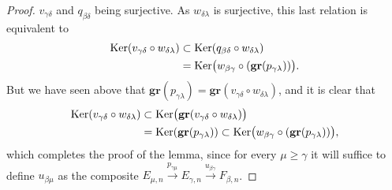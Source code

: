 \begin{proof}
$v_{\gamma\delta}$ and $q_{\beta\delta}$ being surjective.
As $w_{\delta\lambda}$ is surjective, this last relation is equivalent to
\[
\begin{split}
  \operatorname{Ker}(v_{\gamma\delta}\circ w_{\delta\lambda})
  &\subset\operatorname{Ker}(q_{\beta\delta}\circ w_{\delta\lambda})\\
  &=\operatorname{Ker}\bigl(w_{\beta\gamma}\circ(\mathbf{gr}(p_{\gamma\lambda}))\bigr).
\end{split}
\]
But we have seen above that
$\mathbf{gr}(p_{\gamma\lambda})=\mathbf{gr}(v_{\gamma\delta}\circ w_{\delta\lambda})$, and it is clear that
\[
\begin{split}
  \operatorname{Ker}(v_{\gamma\delta}\circ w_{\delta\lambda})
  &\subset\operatorname{Ker}\bigl(\mathbf{gr}(v_{\gamma\delta}\circ w_{\delta\lambda})\bigr)\\
  &=\operatorname{Ker}(\mathbf{gr}(p_{\gamma\lambda}))
  \subset\operatorname{Ker}\bigl(w_{\beta\gamma}\circ(\mathbf{gr}(p_{\gamma\lambda}))\bigr),
\end{split}
\]
which completes the proof of the lemma, since for every $\mu\geq\gamma$ it will suffice to define $u_{\beta\mu}$ as the composite $E_{\mu,n}\xrightarrow{p_{\gamma\mu}}E_{\gamma,n}\xrightarrow{u_{\beta\gamma}}F_{\beta,n}$.
\end{proof}

